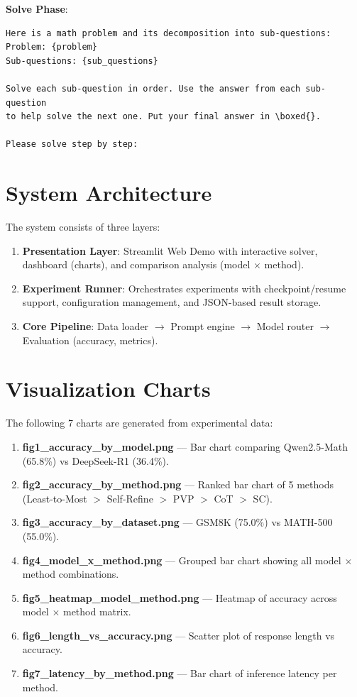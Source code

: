 \documentclass[conference]{IEEEtran}
\begin{document}
\textbf{Solve Phase}:
\begin{lstlisting}
Here is a math problem and its decomposition into sub-questions:
Problem: {problem}
Sub-questions: {sub_questions}

Solve each sub-question in order. Use the answer from each sub-question
to help solve the next one. Put your final answer in \boxed{}.

Please solve step by step:
\end{lstlisting}

\section{System Architecture}
\label{sec:architecture}

The system consists of three layers:
\begin{enumerate}
    \item \textbf{Presentation Layer}: Streamlit Web Demo with interactive solver, dashboard (charts), and comparison analysis (model $\times$ method).
    \item \textbf{Experiment Runner}: Orchestrates experiments with checkpoint/resume support, configuration management, and JSON-based result storage.
    \item \textbf{Core Pipeline}: Data loader $\rightarrow$ Prompt engine $\rightarrow$ Model router $\rightarrow$ Evaluation (accuracy, metrics).
\end{enumerate}

\section{Visualization Charts}
\label{sec:charts}

The following 7 charts are generated from experimental data:
\begin{enumerate}
    \item \textbf{fig1\_accuracy\_by\_model.png} --- Bar chart comparing Qwen2.5-Math (65.8\%) vs DeepSeek-R1 (36.4\%).
    \item \textbf{fig2\_accuracy\_by\_method.png} --- Ranked bar chart of 5 methods (Least-to-Most $>$ Self-Refine $>$ PVP $>$ CoT $>$ SC).
    \item \textbf{fig3\_accuracy\_by\_dataset.png} --- GSM8K (75.0\%) vs MATH-500 (55.0\%).
    \item \textbf{fig4\_model\_x\_method.png} --- Grouped bar chart showing all model $\times$ method combinations.
    \item \textbf{fig5\_heatmap\_model\_method.png} --- Heatmap of accuracy across model $\times$ method matrix.
    \item \textbf{fig6\_length\_vs\_accuracy.png} --- Scatter plot of response length vs accuracy.
    \item \textbf{fig7\_latency\_by\_method.png} --- Bar chart of inference latency per method.
\end{enumerate}
\end{document}
